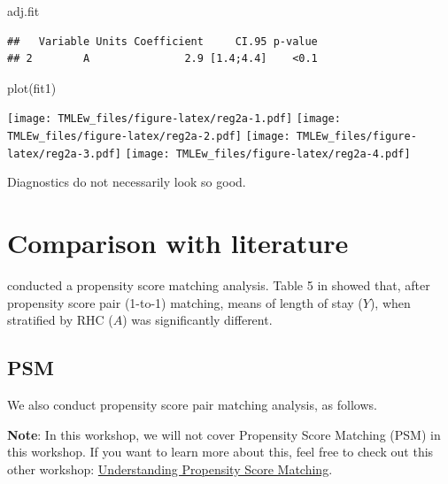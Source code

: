 \documentclass[
]{book}
\newenvironment{Shaded}{\begin{snugshade}}{\end{snugshade}}
\newcommand{\FunctionTok}[1]{\textcolor[rgb]{0.00,0.00,0.00}{#1}}
\newcommand{\NormalTok}[1]{#1}
\begin{document}
\begin{Shaded}
\begin{Highlighting}[]
\NormalTok{adj.fit }
\end{Highlighting}
\end{Shaded}

\begin{verbatim}
##   Variable Units Coefficient     CI.95 p-value
## 2        A               2.9 [1.4;4.4]    <0.1
\end{verbatim}

\begin{Shaded}
\begin{Highlighting}[]
\FunctionTok{plot}\NormalTok{(fit1)}
\end{Highlighting}
\end{Shaded}

\texttt{[image: TMLEw\_files/figure-latex/reg2a-1.pdf]} \texttt{[image: TMLEw\_files/figure-latex/reg2a-2.pdf]} \texttt{[image: TMLEw\_files/figure-latex/reg2a-3.pdf]} \texttt{[image: TMLEw\_files/figure-latex/reg2a-4.pdf]}

Diagnostics do not necessarily look so good.

\hypertarget{comparison-with-literature}{%
\section{Comparison with literature}\label{comparison-with-literature}}

\citet{connors1996effectiveness} conducted a propensity score matching analysis. Table 5 in \citet{connors1996effectiveness} showed that, after propensity score pair (1-to-1) matching, means of length of stay (\(Y\)), when stratified by RHC (\(A\)) was significantly different.

\hypertarget{psm}{%
\subsection{PSM}\label{psm}}

We also conduct propensity score pair matching analysis, as follows.

\textbf{Note}: In this workshop, we will not cover Propensity Score Matching (PSM) in this workshop. If you want to learn more about this, feel free to check out this other workshop: \href{https://ehsanx.github.io/psw/}{Understanding Propensity Score Matching}.
\end{document}
